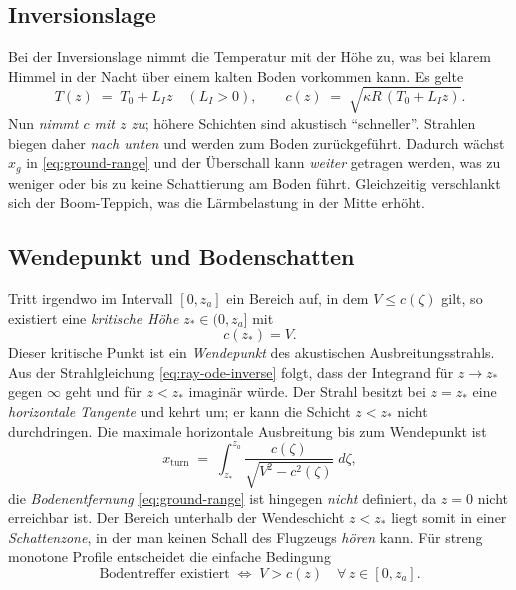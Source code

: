 \subsection*{Inversionslage}
Bei der Inversionslage nimmt die Temperatur mit der Höhe zu, was bei klarem
Himmel in der Nacht über einem kalten Boden vorkommen kann.
Es gelte
\begin{equation}
    T(z) \;=\; T_0 + L_{I} z \quad (L_{I}>0),
    \qquad
    c(z) \;=\; \sqrt{\kappa R\,(T_0 + L_{I} z)} .
    \label{eq:inversion}
\end{equation}
Nun \emph{nimmt $c$ mit $z$ zu}; höhere Schichten sind akustisch ``schneller''.
Strahlen biegen daher \emph{nach unten} und werden zum Boden zurückgeführt.
Dadurch wächst $x_g$ in \eqref{eq:ground-range} und der Überschall
kann \emph{weiter} getragen werden, was zu weniger oder bis zu keine
Schattierung am Boden führt.
Gleichzeitig verschlankt sich der Boom-Teppich, was die
Lärmbelastung in der Mitte erhöht.

\subsection*{Wendepunkt und Bodenschatten}
Tritt irgendwo im Intervall $[0,z_a]$ ein Bereich auf, in dem
$V\le c(\zeta)$ gilt, so existiert eine
\emph{kritische Höhe} $z_\ast\in(0,z_a]$ mit
\begin{equation}
    c(z_\ast)=V.
    \label{eq:turning-def}
\end{equation}
Dieser kritische Punkt ist ein \emph{Wendepunkt} des akustischen Ausbreitungsstrahls.
Aus der Strahlgleichung \eqref{eq:ray-ode-inverse} folgt, dass der
Integrand für $z\to z_\ast$ gegen $\boldsymbol{\infty}$ geht und für $z<z_\ast$ imaginär würde.
Der Strahl besitzt bei $z=z_\ast$ eine \emph{horizontale Tangente} und kehrt um;
er kann die Schicht $z<z_\ast$ nicht durchdringen.
Die maximale horizontale Ausbreitung bis zum Wendepunkt ist
\begin{equation}
    x_{\mathrm{turn}}
    \;=\; \int_{z_\ast}^{z_a} \frac{c(\zeta)}{\sqrt{V^2 - c^2(\zeta)}}\;d\zeta,
    \label{eq:x-turn}
\end{equation}
die \emph{Bodenentfernung} \eqref{eq:ground-range} ist hingegen \emph{nicht}
definiert, da $z=0$ nicht erreichbar ist.
Der Bereich unterhalb der Wendeschicht $z<z_\ast$ liegt somit in einer
\emph{Schattenzone}, in der man keinen Schall des Flugzeugs \emph{hören} kann.
Für streng monotone Profile entscheidet die einfache Bedingung
\begin{equation}
    \text{Bodentreffer existiert} \;\Leftrightarrow\; V>c(z)\quad\forall\,z\in[0,z_a].
    \label{eq:ground-hit-condition}
\end{equation}

